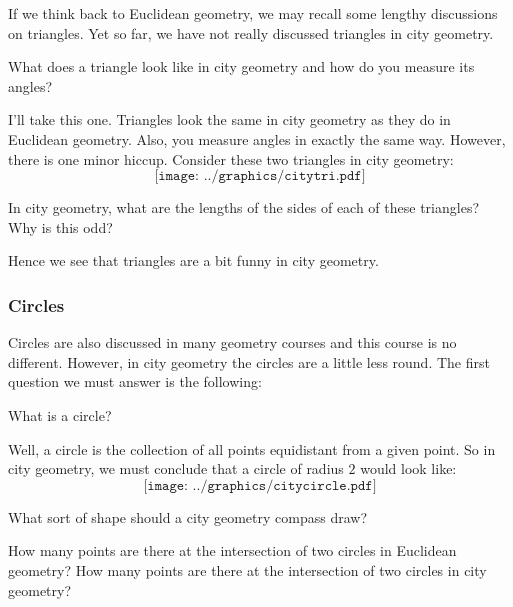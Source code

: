 If we think back to Euclidean geometry, we
may recall some lengthy discussions on triangles. Yet so far, we have
not really discussed triangles in city geometry.

\begin{question} What does a triangle look like in city geometry and how do you measure its angles? 
\end{question}

I'll take this one. Triangles look the same in city geometry as they
do in Euclidean geometry. Also, you measure angles in exactly the same
way. However, there is one minor hiccup. Consider these two triangles
in city geometry:
\[
\texttt{[image: ../graphics/citytri.pdf]}
\]
\begin{question} 
In city geometry, what are the lengths of the sides of each of these triangles? Why is
this odd?
\end{question}
\QM 

Hence we see that triangles are a bit funny in city geometry.

\subsubsection{Circles}

Circles are also discussed in many geometry courses and this course is
no different. However, in city geometry the circles are a little less
round. The first question we must answer is the following:

\begin{question} What is a circle?
\end{question}

Well, a circle is the collection of all points equidistant from a
given point. So in city geometry, we must conclude that a circle of
radius $2$ would look like:
\[
\texttt{[image: ../graphics/citycircle.pdf]}
\]
\begin{question} What sort of shape should a city geometry compass draw?
\end{question}
\QM

\begin{question} 
How many points are there at the intersection of two circles in
Euclidean geometry? How many points are there at the intersection of
two circles in city geometry?
\end{question}
\QM


